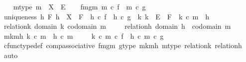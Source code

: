 \begin{isabellebody}
\ \ \isamarkupfalse%
\ m{\isacharunderscore}{\kern0pt}type{\isacharcolon}{\kern0pt}\ {\isachardoublequoteopen}m\ {\isacharcolon}{\kern0pt}\ X\ {\isasymrightarrow}\ E{\isachardoublequoteclose}\isanewline
\ \ \isamarkupfalse%
\ fm{\isacharunderscore}{\kern0pt}gm{\isacharcolon}{\kern0pt}\ {\isachardoublequoteopen}m\ {\isasymcirc}\isactrlsub c\ f\ {\isacharequal}{\kern0pt}\ m\ {\isasymcirc}\isactrlsub c\ g{\isachardoublequoteclose}\isanewline
\ \ \isamarkupfalse%
\ uniqueness{\isacharcolon}{\kern0pt}\ {\isachardoublequoteopen}{\isasymforall}h\ F{\isachardot}{\kern0pt}\ h\ {\isacharcolon}{\kern0pt}\ X\ {\isasymrightarrow}\ F\ {\isasymand}\ h\ {\isasymcirc}\isactrlsub c\ f\ {\isacharequal}{\kern0pt}\ h\ {\isasymcirc}\isactrlsub c\ g\ {\isasymlongrightarrow}\ {\isacharparenleft}{\kern0pt}{\isasymexists}{\isacharbang}{\kern0pt}k{\isachardot}{\kern0pt}\ k\ {\isacharcolon}{\kern0pt}\ E\ {\isasymrightarrow}\ F\ {\isasymand}\ k\ {\isasymcirc}\isactrlsub c\ m\ {\isacharequal}{\kern0pt}\ h{\isacharparenright}{\kern0pt}{\isachardoublequoteclose}\isanewline
\ \ \isamarkupfalse%
\ relation{\isacharunderscore}{\kern0pt}k{\isacharcolon}{\kern0pt}\ {\isachardoublequoteopen}domain\ k\ {\isacharequal}{\kern0pt}codomain\ m\ {\isachardoublequoteclose}\isanewline
\ \ \isamarkupfalse%
\ relation{\isacharunderscore}{\kern0pt}h{\isacharcolon}{\kern0pt}\ {\isachardoublequoteopen}domain\ h\ {\isacharequal}{\kern0pt}\ codomain\ m{\isachardoublequoteclose}\ \isanewline
\ \ \isamarkupfalse%
\ m{\isacharunderscore}{\kern0pt}k{\isacharunderscore}{\kern0pt}mh{\isacharcolon}{\kern0pt}\ {\isachardoublequoteopen}k\ {\isasymcirc}\isactrlsub c\ m\ {\isacharequal}{\kern0pt}\ h\ {\isasymcirc}\isactrlsub c\ m{\isachardoublequoteclose}\ \isanewline
\isanewline
\ \ \isamarkupfalse%
\ {\isachardoublequoteopen}k\ {\isasymcirc}\isactrlsub c\ m\ {\isasymcirc}\isactrlsub c\ f\ {\isacharequal}{\kern0pt}\ h\ {\isasymcirc}\isactrlsub c\ m\ {\isasymcirc}\isactrlsub c\ g{\isachardoublequoteclose}\isanewline
\ \ \ \ \isamarkupfalse%
\ cfunc{\isacharunderscore}{\kern0pt}type{\isacharunderscore}{\kern0pt}def\ comp{\isacharunderscore}{\kern0pt}associative\ fm{\isacharunderscore}{\kern0pt}gm\ g{\isacharunderscore}{\kern0pt}type\ m{\isacharunderscore}{\kern0pt}k{\isacharunderscore}{\kern0pt}mh\ m{\isacharunderscore}{\kern0pt}type\ relation{\isacharunderscore}{\kern0pt}k\ relation{\isacharunderscore}{\kern0pt}h\ \isamarkupfalse%
\ auto\isanewline
\isanewline

\end{isabellebody}
